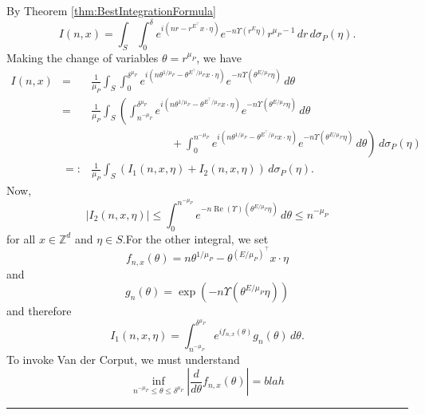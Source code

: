 \documentclass[11pt]{article}
\renewcommand\Re{\operatorname{Re}}%
\newcommand{\f}[2]{\frac{#1}{#2}}
\begin{document}
By Theorem \ref{thm:BestIntegrationFormula}
\begin{equation*}
    I(n,x)=\int_S\int_0^\delta e^{i( nr-r^{E^\top} x\cdot \eta)} e^{-n\Upsilon(r^E \eta)}r^{\mu_P-1}\,dr\, d\sigma_P(\eta).
\end{equation*}
Making the change of variables $\theta=r^{\mu_P}$, we have
\begin{eqnarray*}
    I(n,x)&=&\f{1}{\mu_P} \int_S\int_0^{\delta^{\mu_P}} e^{i( n\theta^{1/\mu_P}-\theta^{E^\top/\mu_P} x\cdot \eta)} e^{-n\Upsilon(\theta^{E/\mu_P} \eta)}  \,d\theta\\
    &=&\frac{1}{\mu_P}\int_S
    \left(\int_{n^{-\mu_P}}^{\delta^{\mu_P}}e^{i( n\theta^{1/\mu_P}-\theta^{E^\top/\mu_P} x\cdot \eta)} e^{-n\Upsilon(\theta^{E/\mu_P} \eta)}\,d\theta \right. \\
    && \left.\hspace{3cm}+\int_0^{n^{-\mu_P}}e^{i( n\theta^{1/\mu_P}-\theta^{E^\top/\mu_P} x\cdot \eta)} e^{-n\Upsilon(\theta^{E/\mu_P} \eta)}\,d\theta\right)\, d\sigma_P(\eta)\\
    &=:&\frac{1}{\mu_P}\int_S \left( I_1(n,x,\eta)+I_2(n,x,\eta)\right)\,d\sigma_P(\eta).
\end{eqnarray*}
Now,
\begin{equation*}
    \left|I_2(n,x,\eta)\right|\leq\int_0^{n^{-\mu_P}}e^{-n\Re(\Upsilon)(\theta^{E/\mu_P}\eta)}\,d\theta\leq n^{-\mu_P}
\end{equation*}
for all $x\in\mathbb{Z}^d$ and $\eta\in S$.For the other integral, we set
\begin{equation*}
    f_{n,x}(\theta)=n\theta^{1/\mu_P}-\theta^{(E/\mu_P)^\top} x\cdot \eta
\end{equation*}
and
\begin{equation*}
g_{n}(\theta)=\exp\left(-n \Upsilon(\theta^{E/\mu_P}\eta)\right)
\end{equation*}
and therefore
\begin{equation*}
    I_1(n,x,\eta)=\int_{n^{-\mu_P}}^{\delta^{\mu_P}}e^{if_{n,x}(\theta)}g_n(\theta)\,d\theta.
\end{equation*}
To invoke Van der Corput, we must understand 
\begin{equation*}
\inf_{n^{-\mu_P}\leq\theta\leq \delta^{\mu_P}}\left|\frac{d}{d\theta}f_{n,x}(\theta)\right|
=
blah
\end{equation*}



\hrule
$\,$\\
\end{document}

